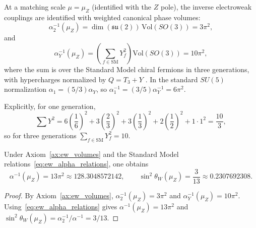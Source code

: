 \begin{axiom}\label{ax:ew_volumes}
At a matching scale $\mu=\mu_Z$ (identified with the $Z$ pole), the inverse electroweak couplings are identified with weighted canonical phase volumes:
\begin{equation}
\alpha_2^{-1}(\mu_Z)=\dim(\mathfrak{su}(2))\,\mathrm{Vol}(SO(3))=3\pi^2,
\end{equation}
and
\begin{equation}
\alpha_Y^{-1}(\mu_Z)=\left(\sum_{f\in \mathrm{SM}} Y_f^2\right)\mathrm{Vol}(SO(3))=10\pi^2,
\end{equation}
where the sum is over the Standard Model chiral fermions in three generations, with hypercharges normalized by $Q=T_3+Y$ \cite{PeskinSchroeder1995,PDGRPP2024}. In the standard $SU(5)$ normalization $\alpha_1=(5/3)\alpha_Y$, so $\alpha_1^{-1}=(3/5)\alpha_Y^{-1}=6\pi^2$.
\end{axiom}

Explicitly, for one generation,
\begin{equation}
\sum Y^2
=6\left(\frac{1}{6}\right)^2+3\left(\frac{2}{3}\right)^2+3\left(\frac{1}{3}\right)^2+2\left(\frac{1}{2}\right)^2+1\cdot 1^2
=\frac{10}{3},
\end{equation}
so for three generations $\sum_{f\in \mathrm{SM}}Y_f^2=10$.

\begin{theorem}\label{thm:weinberg_angle}
Under Axiom~\ref{ax:ew_volumes} and the Standard Model relations~\eqref{eq:ew_alpha_relations}, one obtains
\begin{equation}
\alpha^{-1}(\mu_Z)=13\pi^2\approx 128.3048572142,
\qquad
\sin^2\theta_W(\mu_Z)=\frac{3}{13}\approx 0.2307692308.
\end{equation}
\end{theorem}
\begin{proof}
By Axiom~\ref{ax:ew_volumes}, $\alpha_2^{-1}(\mu_Z)=3\pi^2$ and $\alpha_Y^{-1}(\mu_Z)=10\pi^2$. Using~\eqref{eq:ew_alpha_relations} gives $\alpha^{-1}(\mu_Z)=13\pi^2$ and $\sin^2\theta_W(\mu_Z)=\alpha_2^{-1}/\alpha^{-1}=3/13$.
\end{proof}

